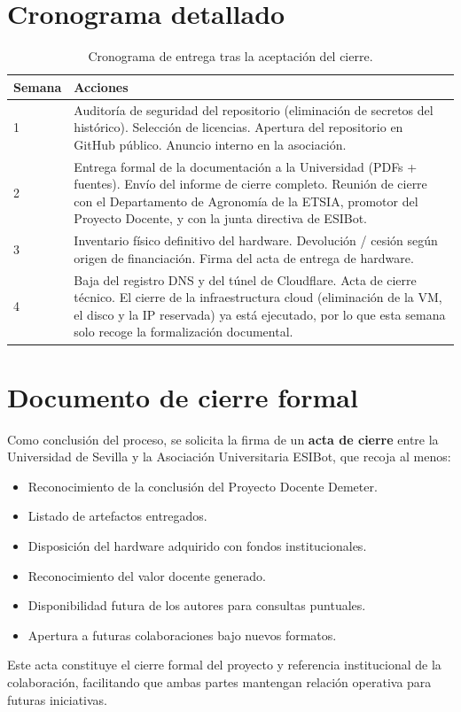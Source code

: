\section{Cronograma detallado}

\begin{table}[H]
    \centering
    \caption{Cronograma de entrega tras la aceptaci\'on del cierre.}
    \label{tab:cronograma_detalle}
    \begin{tabular}{p{2cm}p{11cm}}
        \toprule
        \textbf{Semana} & \textbf{Acciones} \\
        \midrule
        1 & Auditor\'ia de seguridad del repositorio (eliminaci\'on de
            secretos del hist\'orico). Selecci\'on de licencias.
            Apertura del repositorio en GitHub p\'ublico. Anuncio
            interno en la asociaci\'on. \\
        \midrule
        2 & Entrega formal de la documentaci\'on a la Universidad
            (PDFs + fuentes). Env\'io del informe de cierre completo.
            Reuni\'on de cierre con el Departamento de Agronom\'ia de la
            ETSIA, promotor del Proyecto Docente, y con la junta directiva
            de ESIBot. \\
        \midrule
        3 & Inventario f\'isico definitivo del hardware. Devoluci\'on /
            cesi\'on seg\'un origen de financiaci\'on. Firma del acta
            de entrega de hardware. \\
        \midrule
        4 & Baja del registro DNS y del t\'unel de Cloudflare. Acta de
            cierre t\'ecnico. El cierre de la infraestructura cloud
            (eliminaci\'on de la VM, el disco y la IP reservada) ya est\'a
            ejecutado, por lo que esta semana solo recoge la
            formalizaci\'on documental. \\
        \bottomrule
    \end{tabular}
\end{table}

\section{Documento de cierre formal}

Como conclusi\'on del proceso, se solicita la firma de un \textbf{acta
de cierre} entre la Universidad de Sevilla y la Asociaci\'on
Universitaria ESIBot, que recoja al menos:

\begin{itemize}[leftmargin=*]
    \item Reconocimiento de la conclusi\'on del Proyecto Docente Demeter.
    \item Listado de artefactos entregados.
    \item Disposici\'on del hardware adquirido con fondos institucionales.
    \item Reconocimiento del valor docente generado.
    \item Disponibilidad futura de los autores para consultas puntuales.
    \item Apertura a futuras colaboraciones bajo nuevos formatos.
\end{itemize}

Este acta constituye el cierre formal del proyecto y referencia
institucional de la colaboraci\'on, facilitando que ambas partes
mantengan relaci\'on operativa para futuras iniciativas.
